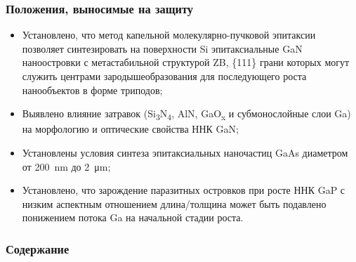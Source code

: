 \begin{frame}
    \setcounter{framenumber}{1}
    \maketitle
\end{frame}

\begin{frame}
    \frametitle{Положения, выносимые на защиту}
    \begin{itemize}
        \item	Установлено, что метод капельной молекулярно-пучковой эпитаксии позволяет синтезировать на поверхности Si эпитаксиальные GaN наноостровки с метастабильной структурой ZB, \{111\} грани которых могут служить центрами зародышеобразования для последующего роста нанообъектов в форме триподов;
        \item Выявлено влияние затравок (Si\textsubscript{3}N\textsubscript{4}, AlN, GaO\textsubscript{x} и субмонослойные слои Ga) на морфологию и оптические свойства ННК GaN;
        \item Установлены условия синтеза эпитаксиальных наночастиц GaAs диаметром от 200~\si{\nano\metre} до 2~\si{\micro\metre};
        \item Установлено, что зарождение паразитных островков при росте ННК GaP с низким аспектным отношением длина/толщина может быть подавлено понижением потока Ga на начальной стадии роста.
    \end{itemize}
\end{frame}

\begin{frame}
    \frametitle{Содержание}
    \tableofcontents
\end{frame}
